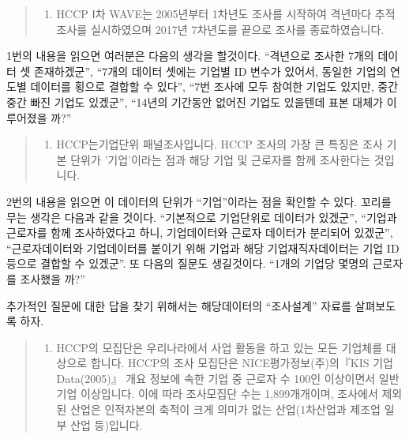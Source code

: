 \documentclass[
]{book}
\providecommand{\tightlist}{%
  \setlength{\itemsep}{0pt}\setlength{\parskip}{0pt}}
\theoremstyle{definition}
\theoremstyle{definition}
\theoremstyle{definition}
\theoremstyle{definition}
\theoremstyle{remark}
\begin{document}
\begin{quote}
\begin{enumerate}
\def\labelenumi{\arabic{enumi}.}
\tightlist
\item
  HCCP Ⅰ차 WAVE는 2005년부터 1차년도 조사를 시작하여 격년마다 추적 조사를 실시하였으며 2017년 7차년도를 끝으로 조사를 종료하였습니다.
\end{enumerate}
\end{quote}

1번의 내용을 읽으면 여러분은 다음의 생각을 할것이다. ``격년으로 조사한 7개의 데이터 셋 존재하겠군'', ``7개의 데이터 셋에는 기업별 ID 변수가 있어서, 동일한 기업의 연도별 데이터를 횡으로 결합할 수 있다'', ``7번 조사에 모두 참여한 기업도 있지만, 중간중간 빠진 기업도 있겠군'', ``14년의 기간동안 없어진 기업도 있을텐데 표본 대체가 이루어졌을 까?''

\begin{quote}
\begin{enumerate}
\def\labelenumi{\arabic{enumi}.}
\setcounter{enumi}{1}
\tightlist
\item
  HCCP는기업단위 패널조사입니다. HCCP 조사의 가장 큰 특징은 조사 기본 단위가 '기업'이라는 점과 해당 기업 및 근로자를 함께 조사한다는 것입니다.
\end{enumerate}
\end{quote}

2번의 내용을 읽으면 이 데이터의 단위가 ``기업''이라는 점을 확인할 수 있다. 꼬리를 무는 생각은 다음과 같을 것이다. ``기본적으로 기업단위로 데이터가 있겠군'', ``기업과 근로자를 함께 조사하였다고 하니, 기업데이터와 근로자 데이터가 분리되어 있겠군'', ``근로자데이터와 기업데이터를 붙이기 위해 기업과 해당 기업재직자데이터는 기업 ID 등으로 결합할 수 있겠군''. 또 다음의 질문도 생길것이다. ``1개의 기업당 몇명의 근로자를 조사했을 까?''

추가적인 질문에 대한 답을 찾기 위해서는 해당데이터의 ``조사설계'' 자료를 살펴보도록 하자.

\begin{quote}
\begin{enumerate}
\def\labelenumi{\arabic{enumi}.}
\setcounter{enumi}{2}
\tightlist
\item
  HCCP의 모집단은 우리나라에서 사업 활동을 하고 있는 모든 기업체를 대상으로 합니다. HCCP의 조사 모집단은 NICE평가정보(주)의『KIS 기업 Data(2005)』 개요 정보에 속한 기업 중 근로자 수 100인 이상이면서 일반 기업 이상입니다. 이에 따라 조사모집단 수는 1,899개개이며, 조사에서 제외된 산업은 인적자본의 축적이 크게 의미가 없는 산업(1차산업과 제조업 일부 산업 등)입니다.
\end{enumerate}
\end{quote}
\end{document}
